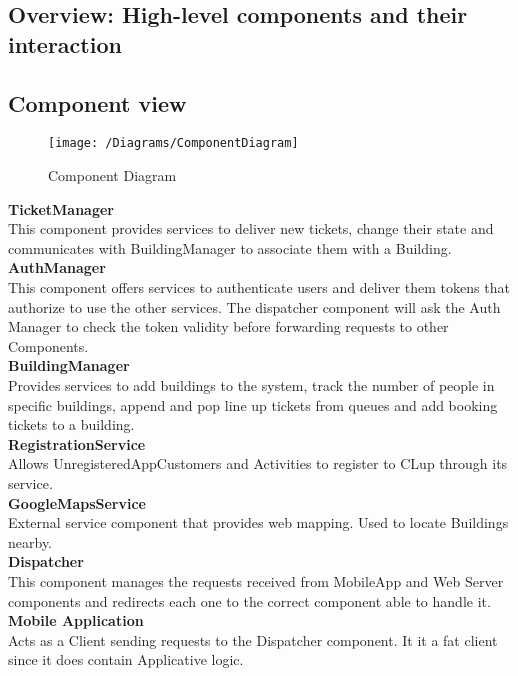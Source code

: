 \subsection{Overview: High-level components and their interaction}

\subsection{Component view}
\begin{figure}[H]
	\centering
	\texttt{[image: /Diagrams/ComponentDiagram]}
	\caption{Component Diagram}
\end{figure}



\textbf{TicketManager}\\
This component provides services to deliver new tickets, change their state and communicates with BuildingManager to associate them with a Building.\\


\textbf{AuthManager}\\
This component offers services to authenticate users and deliver them tokens that authorize to use the other services. The dispatcher component will ask the Auth Manager to check the token validity before forwarding requests to other Components.\\

\textbf{BuildingManager}\\
Provides services to add buildings to the system, track the number of people in specific buildings, append and pop line up tickets from queues and add booking tickets to a building.\\

\textbf{RegistrationService}\\
Allows UnregisteredAppCustomers and Activities to register to CLup through its service.\\

\textbf{GoogleMapsService}\\
External service component that provides web mapping. Used to locate Buildings nearby.\\

\textbf{Dispatcher}\\
This component manages the requests received from MobileApp and Web Server components and redirects each one to the correct component able to handle it.\\

\textbf{Mobile Application}\\
Acts as a Client sending requests to the Dispatcher component.
It it a fat client since it does contain Applicative logic.\\

